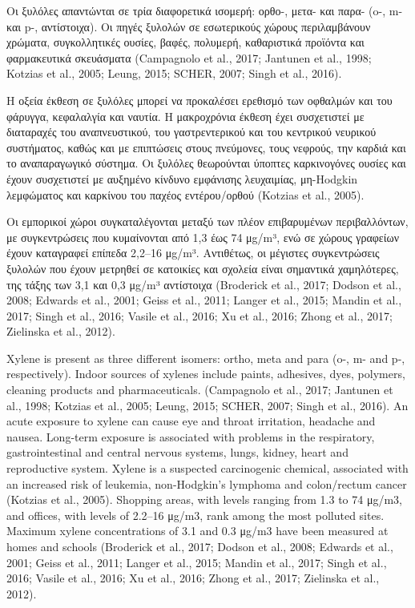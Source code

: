 Οι ξυλόλες απαντώνται σε τρία διαφορετικά ισομερή: ορθο-, μετα- και παρα- (o-, m- και p-, αντίστοιχα). Οι πηγές ξυλολών σε εσωτερικούς χώρους περιλαμβάνουν χρώματα, συγκολλητικές ουσίες, βαφές, πολυμερή, καθαριστικά προϊόντα και φαρμακευτικά σκευάσματα (Campagnolo et al., 2017; Jantunen et al., 1998; Kotzias et al., 2005; Leung, 2015; SCHER, 2007; Singh et al., 2016).

Η οξεία έκθεση σε ξυλόλες μπορεί να προκαλέσει ερεθισμό των οφθαλμών και του φάρυγγα, κεφαλαλγία και ναυτία. Η μακροχρόνια έκθεση έχει συσχετιστεί με διαταραχές του αναπνευστικού, του γαστρεντερικού και του κεντρικού νευρικού συστήματος, καθώς και με επιπτώσεις στους πνεύμονες, τους νεφρούς, την καρδιά και το αναπαραγωγικό σύστημα. Οι ξυλόλες θεωρούνται ύποπτες καρκινογόνες ουσίες και έχουν συσχετιστεί με αυξημένο κίνδυνο εμφάνισης λευχαιμίας, μη-Hodgkin λεμφώματος και καρκίνου του παχέος εντέρου/ορθού (Kotzias et al., 2005).

Οι εμπορικοί χώροι συγκαταλέγονται μεταξύ των πλέον επιβαρυμένων περιβαλλόντων, με συγκεντρώσεις που κυμαίνονται από 1,3 έως 74 μg/m³, ενώ σε χώρους γραφείων έχουν καταγραφεί επίπεδα 2,2–16 μg/m³. Αντιθέτως, οι μέγιστες συγκεντρώσεις ξυλολών που έχουν μετρηθεί σε κατοικίες και σχολεία είναι σημαντικά χαμηλότερες, της τάξης των 3,1 και 0,3 μg/m³ αντίστοιχα (Broderick et al., 2017; Dodson et al., 2008; Edwards et al., 2001; Geiss et al., 2011; Langer et al., 2015; Mandin et al., 2017; Singh et al., 2016; Vasile et al., 2016; Xu et al., 2016; Zhong et al., 2017; Zielinska et al., 2012).

Xylene is present as three different isomers: ortho, meta and para (o-, m- and p-, respectively). Indoor sources of xylenes include paints, adhesives, dyes, polymers, cleaning products and pharmaceuticals. (Campagnolo et al., 2017; Jantunen et al., 1998; Kotzias et al., 2005; Leung, 2015; SCHER, 2007; Singh et al., 2016). An acute exposure to xylene can cause eye and throat irritation, headache and nausea. Long-term exposure is associated with problems in the respiratory, gastrointestinal and central nervous systems, lungs, kidney, heart and reproductive system. Xylene is a suspected carcinogenic chemical, associated with an increased risk of leukemia, non-Hodgkin’s lymphoma and colon/rectum cancer (Kotzias et al., 2005). Shopping areas, with levels ranging from 1.3 to 74 μg/m3, and offices, with levels of 2.2–16 μg/m3, rank among the most polluted sites. Maximum xylene concentrations of 3.1 and 0.3 μg/m3 have been measured at homes and schools (Broderick et al., 2017; Dodson et al., 2008; Edwards et al., 2001; Geiss et al., 2011; Langer et al., 2015; Mandin et al., 2017; Singh et al., 2016; Vasile et al., 2016; Xu et al., 2016; Zhong et al., 2017; Zielinska et al., 2012).


